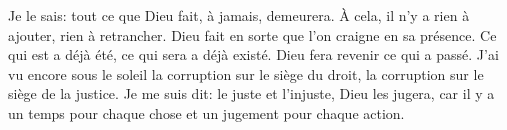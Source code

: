 Je le sais: tout ce que Dieu fait, à jamais, demeurera.
	À cela, il n’y a rien à ajouter, rien à retrancher.
Dieu fait en sorte que l’on craigne en sa présence.
Ce qui est a déjà été, ce qui sera a déjà existé.
	Dieu fera revenir ce qui a passé.
J’ai vu encore sous le soleil la corruption sur le siège du droit,
	la corruption sur le siège de la justice.
Je me suis dit: le juste et l’injuste, Dieu les jugera,
	car il y a un temps pour chaque chose et un jugement pour chaque action.
